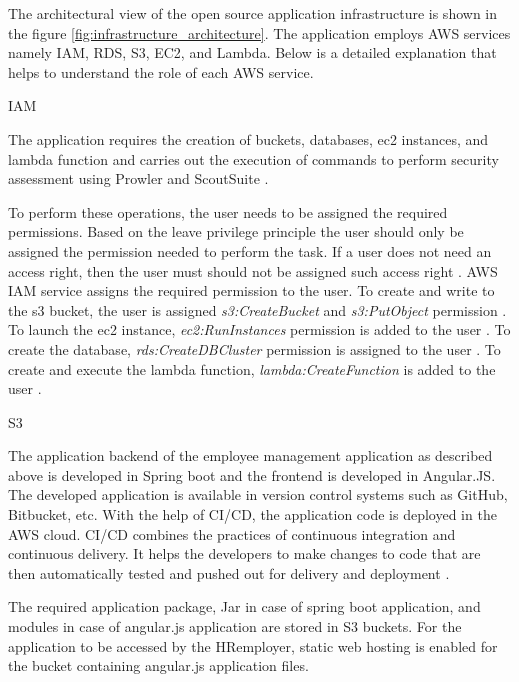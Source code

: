 \par The architectural view of the open source application infrastructure is shown in the figure
\ref{fig:infrastructure_architecture}.
The application employs AWS services namely IAM, RDS, S3, EC2, and Lambda.
Below is a detailed explanation that helps to understand the role of each AWS service.

\par IAM

\par The application requires the creation of buckets, databases, ec2 instances, and lambda function and carries out the
execution of commands to perform security assessment using Prowler and ScoutSuite \cite{70}.

\par To perform these operations, the user needs to be assigned the required permissions.
Based on the leave privilege principle the user should only be assigned the permission needed to perform the task.
If a user does not need an access right, then the user must should not be assigned such access right \cite{81}.
AWS IAM service assigns the required permission to the user.
To create and write to the s3 bucket, the user is assigned \textit{s3:CreateBucket} and \textit{s3:PutObject} permission \cite{82}.
To launch the ec2 instance, \textit{ec2:RunInstances} permission is added to the user \cite{83}.
To create the database, \textit{rds:CreateDBCluster} permission is assigned to the user \cite{85}.
To create and execute the lambda function, \textit{lambda:CreateFunction} is added to the user \cite{85}.
\hfill \break
\par S3

\par The application backend of the employee management application as described above is developed in Spring boot and the frontend is developed in Angular.JS. The developed application is available in version control systems such as GitHub, Bitbucket, etc.
With the help of CI/CD, the application code is deployed in the AWS cloud.
CI/CD combines the practices of continuous integration and continuous delivery.
It helps the developers to make changes to code that are then automatically tested and pushed out for delivery and deployment \cite{71}.

\par The required application package, Jar in case of spring boot application, and modules in case of angular.js application are stored in S3 buckets.
For the application to be accessed by the HR\/employer, static web hosting is enabled for the bucket containing angular.js application files.


